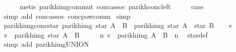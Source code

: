 \begin{isabellebody}
\ \ \ \ \isamarkupfalse%
\ {\isacharparenleft}{\kern0pt}metis\ parikh{\isacharunderscore}{\kern0pt}img{\isacharunderscore}{\kern0pt}commut\ conc{\isacharunderscore}{\kern0pt}assoc\ parikh{\isacharunderscore}{\kern0pt}conc{\isacharunderscore}{\kern0pt}left{\isacharparenright}{\kern0pt}\isanewline
\ \ \isamarkupfalse%
\ \isamarkupfalse%
\ {\isacharquery}{\kern0pt}case\ \isamarkupfalse%
\ {\isacharparenleft}{\kern0pt}simp\ add{\isacharcolon}{\kern0pt}\ conc{\isacharunderscore}{\kern0pt}assoc\ conc{\isacharunderscore}{\kern0pt}pow{\isacharunderscore}{\kern0pt}comm{\isacharparenright}{\kern0pt}\isanewline
{}\isamarkupfalse%
\ simp%
\endisatagproof
{\isafoldproof}%
%
\isadelimproof
\isanewline
%
\endisadelimproof
\isanewline
{}\isamarkupfalse%
\ parikh{\isacharunderscore}{\kern0pt}img{\isacharunderscore}{\kern0pt}conc{\isacharunderscore}{\kern0pt}star{\isacharcolon}{\kern0pt}\ {\isachardoublequoteopen}parikh{\isacharunderscore}{\kern0pt}img\ {\isacharparenleft}{\kern0pt}star\ {\isacharparenleft}{\kern0pt}A\ {\isacharat}{\kern0pt}{\isacharat}{\kern0pt}\ B{\isacharparenright}{\kern0pt}{\isacharparenright}{\kern0pt}\ {\isasymsubseteq}\ parikh{\isacharunderscore}{\kern0pt}img\ {\isacharparenleft}{\kern0pt}star\ A\ {\isacharat}{\kern0pt}{\isacharat}{\kern0pt}\ star\ B{\isacharparenright}{\kern0pt}{\isachardoublequoteclose}\isanewline
%
\isadelimproof
%
\endisadelimproof
%
\isatagproof
{}\isamarkupfalse%
\isanewline
\ \ \isamarkupfalse%
\ v\isanewline
\ \ \isamarkupfalse%
\ {\isachardoublequoteopen}v\ {\isasymin}\ parikh{\isacharunderscore}{\kern0pt}img\ {\isacharparenleft}{\kern0pt}star\ {\isacharparenleft}{\kern0pt}A\ {\isacharat}{\kern0pt}{\isacharat}{\kern0pt}\ B{\isacharparenright}{\kern0pt}{\isacharparenright}{\kern0pt}{\isachardoublequoteclose}\isanewline
\ \ \isamarkupfalse%
\ \isamarkupfalse%
\ {\isachardoublequoteopen}{\isasymexists}n{\isachardot}{\kern0pt}\ v\ {\isasymin}\ parikh{\isacharunderscore}{\kern0pt}img\ {\isacharparenleft}{\kern0pt}{\isacharparenleft}{\kern0pt}A\ {\isacharat}{\kern0pt}{\isacharat}{\kern0pt}\ B{\isacharparenright}{\kern0pt}\ {\isacharcircum}{\kern0pt}{\isacharcircum}{\kern0pt}\ n{\isacharparenright}{\kern0pt}{\isachardoublequoteclose}\ \isamarkupfalse%
\ star{\isacharunderscore}{\kern0pt}def\ \isamarkupfalse%
\ {\isacharparenleft}{\kern0pt}simp\ add{\isacharcolon}{\kern0pt}\ parikh{\isacharunderscore}{\kern0pt}img{\isacharunderscore}{\kern0pt}UNION{\isacharparenright}{\kern0pt}\isanewline

\end{isabellebody}
